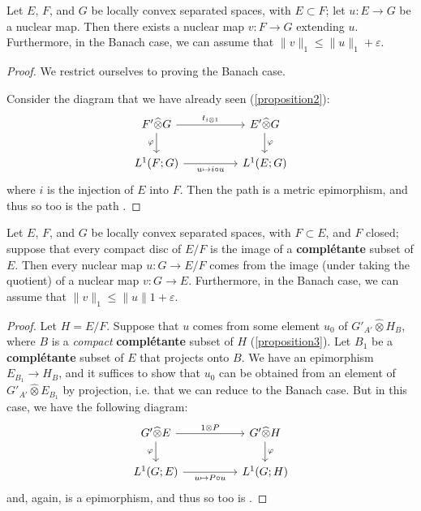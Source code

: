 \documentclass{article}
\theoremstyle{plain}
\newenvironment{proposition}[1]
    {\renewcommand\theinnercustomproposition{#1}\innercustomproposition}
    {\endinnercustomproposition}
\theoremstyle{definition}
\newcommand{\cotimes}{\widehat{\otimes}}
\renewcommand{\leq}{\leqslant}
\newcommand{\oldpage}[1]{\marginpar{\footnotesize$\Big\vert$ \textit{p.~#1}}}
\begin{document}
\oldpage{6}
\begin{proposition}{7}
\label{proposition7}
  Let $E$, $F$, and $G$ be locally convex separated spaces, with $E\subset F$;
  let $u\colon E\to G$ be a nuclear map.
  Then there exists a nuclear map $v\colon F\to G$ extending $u$.
  Furthermore, in the Banach case, we can assume that $\|v\|_1\leq\|u\|_1+\varepsilon$.
\end{proposition}

\begin{proof}
  We restrict ourselves to proving the Banach case.

  Consider the diagram that we have already seen (\cref{proposition2}):
  \[
    \begin{tikzcd}[column sep=huge]
      F'\cotimes G \ar[r,"t_{i\otimes1}"] \ar[d,swap,"\varphi"]
      & E'\cotimes G \ar[d,"\varphi"]
    \\L^1(F;G) \ar[r,swap,"u\mapsto i\circ u"]
      & L^1(E;G)
    \end{tikzcd}
  \]
  where $i$ is the injection of $E$ into $F$.
  Then the path  is a metric epimorphism, and thus so too is the path .
\end{proof}

\begin{proposition}{8}
\label{proposition8}
  Let $E$, $F$, and $G$ be locally convex separated spaces, with $F\subset E$, and $F$ closed;
  suppose that every compact disc of $E/F$ is the image of a \textbf{compl\'{e}tante} subset of $E$.
  Then every nuclear map $u\colon G\to E/F$ comes from the image (under taking the quotient) of a nuclear map $v\colon G\to E$.
  Furthermore, in the Banach case, we can assume that $\|v\|_1\leq\|u\|1+\varepsilon$.
\end{proposition}

\begin{proof}
  Let $H=E/F$.
  Suppose that $u$ comes from some element $u_0$ of $G'_{A'}\cotimes H_B$, where $B$ is a \emph{compact} \textbf{compl\'{e}tante} subset of $H$ (\cref{proposition3}).
  Let $B_1$ be a \textbf{compl\'{e}tante} subset of $E$ that projects onto $B$.
  We have an epimorphism $E_{B_1}\to H_B$, and it suffices to show that $u_0$ can be obtained from an element of $G'_{A'}\cotimes E_{B_1}$ by projection, i.e. that we can reduce to the Banach case.
  But in this case, we have the following diagram:
  \[
    \begin{tikzcd}[column sep=huge]
      G'\cotimes E \ar[r,"1\otimes P"] \ar[d,swap,"\varphi"]
      & G'\cotimes H \ar[d,"\varphi"]
    \\L^1(G;E) \ar[r,swap,"u\mapsto P\circ u"]
      & L^1(G;H)
    \end{tikzcd}
  \]
  and, again,  is a epimorphism, and thus so too is .
\end{proof}
\end{document}
